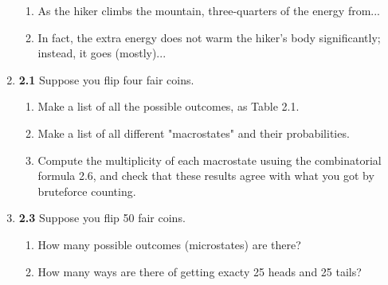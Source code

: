 \documentclass[fleqn]{article}
\begin{document}
\begin{enumerate}
\begin{enumerate}

      \item As the hiker climbs the mountain, three-quarters of the energy from...


      \item In fact, the extra energy does not warm the hiker's body significantly; instead, it goes (mostly)...


    \end{enumerate}


    \item \textbf{2.1} Suppose you flip four fair coins.
    \begin{enumerate}
      \item Make a list of all the possible outcomes, as Table 2.1.


      \item Make a list of all different "macrostates" and their probabilities.


      \item Compute the multiplicity of each macrostate usuing the combinatorial formula 2.6, and check 
      that these results agree with what you got by bruteforce counting.

      
    \end{enumerate}


    \item \textbf{2.3} Suppose you flip 50 fair coins.
    \begin{enumerate}
      \item How many possible outcomes (microstates) are there?


      \item How many ways are there of getting exacty 25 heads and 25 tails?


\end{enumerate}
\end{enumerate}
\end{document}

